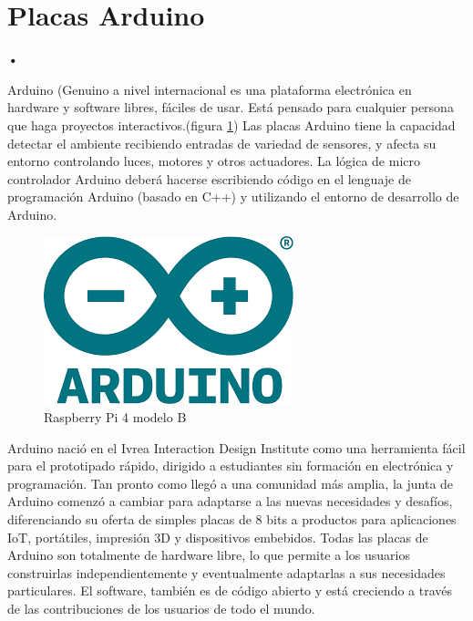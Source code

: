 \section{Placas Arduino}
\textbf{•}

Arduino (Genuino a nivel internacional es una plataforma electrónica en hardware y software libres, fáciles de usar. Está pensado para cualquier persona que haga proyectos interactivos.\cite{ArduinoOfficial}(figura \ref{fig:arduino_logo}) Las placas Arduino tiene la capacidad  detectar el ambiente recibiendo entradas de variedad de sensores, y afecta su entorno controlando luces, motores y otros actuadores. La lógica de micro controlador Arduino deberá hacerse escribiendo código en el lenguaje de programación Arduino (basado en C++) y utilizando el entorno de desarrollo de Arduino.\\

\begin{figure}[htb]
\centering
\includegraphics[scale=0.35]{./Figuras/arduino_logo.png}
\caption{Raspberry Pi 4 modelo B}
\label{fig:arduino_logo}
\vspace*{-10pt}
\end{figure}

Arduino nació en el Ivrea Interaction Design Institute como una herramienta fácil para el prototipado rápido, dirigido a estudiantes sin formación en electrónica y programación. Tan pronto como llegó a una comunidad más amplia, la junta de Arduino comenzó a cambiar para adaptarse a las nuevas necesidades y desafíos, diferenciando su oferta de simples placas de 8 bits a productos para aplicaciones IoT, portátiles, impresión 3D y dispositivos embebidos. Todas las placas de Arduino son totalmente de hardware libre, lo que permite a los usuarios construirlas independientemente y eventualmente adaptarlas a sus necesidades particulares. El software, también es de código abierto y está creciendo a través de las contribuciones de los usuarios de todo el mundo.\\

